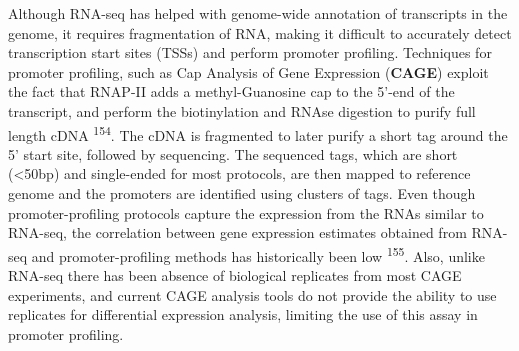 \documentclass[11pt,twoside]{MPIthesis}
\theoremstyle{definition}
\theoremstyle{definition}
\theoremstyle{definition}
\theoremstyle{remark}
\begin{document}
Although RNA-seq has helped with genome-wide annotation of transcripts
in the genome, it requires fragmentation of RNA, making it difficult to
accurately detect transcription start sites (TSSs) and perform promoter
profiling. Techniques for promoter profiling, such as Cap Analysis of
Gene Expression (\textbf{CAGE}) exploit the fact that RNAP-II adds a
methyl-Guanosine cap to the 5'-end of the transcript, and perform the
biotinylation and RNAse digestion to purify full length cDNA
\textsuperscript{154}. The cDNA is fragmented to later purify a short
tag around the 5' start site, followed by sequencing. The sequenced
tags, which are short (\textless{}50bp) and single-ended for most
protocols, are then mapped to reference genome and the promoters are
identified using clusters of tags. Even though promoter-profiling
protocols capture the expression from the RNAs similar to RNA-seq, the
correlation between gene expression estimates obtained from RNA-seq and
promoter-profiling methods has historically been low
\textsuperscript{155}. Also, unlike RNA-seq there has been absence of
biological replicates from most CAGE experiments, and current CAGE
analysis tools do not provide the ability to use replicates for
differential expression analysis, limiting the use of this assay in
promoter profiling.
\end{document}
